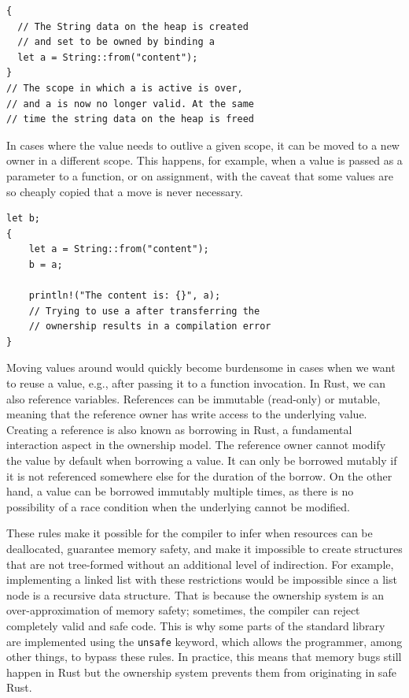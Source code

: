 \documentclass[paper=a4,%
  twoside,%
  BCOR4mm,%
  abstract=true,%
  toc=bibliography,%
  chapterprefix=true,%
  toc=bibliographynumbered,%
  open=right,%
  english,%
  pagesize=pdftex]{scrreprt}
\begin{document}
\begin{lstlisting}[style=boxed, caption=Heap data owned by binding, label=lst:example-ownership]
{
  // The String data on the heap is created
  // and set to be owned by binding a
  let a = String::from("content");
}
// The scope in which a is active is over,
// and a is now no longer valid. At the same
// time the string data on the heap is freed
\end{lstlisting}

In cases where the value needs to outlive a given scope, it can be moved to a new owner in a different scope. This happens, for example, when a value is passed as a parameter to a function, or on assignment, with the caveat that some values are so cheaply copied that a move is never necessary.

\begin{lstlisting}[style=boxed, caption=Transferring ownership, label=lst:transfer-ownership]
let b;
{
    let a = String::from("content");
    b = a;

    println!("The content is: {}", a);
    // Trying to use a after transferring the
    // ownership results in a compilation error
}
\end{lstlisting}

Moving values around would quickly become burdensome in cases when we want to reuse a value, e.g., after passing it to a function invocation. In Rust, we can also reference variables. References can be immutable (read-only) or mutable, meaning that the reference owner has write access to the underlying value. Creating a reference is also known as borrowing in Rust, a fundamental interaction aspect in the ownership model. The reference owner cannot modify the value by default when borrowing a value. It can only be borrowed mutably if it is not referenced somewhere else for the duration of the borrow. On the other hand, a value can be borrowed immutably multiple times, as there is no possibility of a race condition when the underlying cannot be modified.

These rules make it possible for the compiler to infer when resources can be deallocated, guarantee memory safety, and make it impossible to create structures that are not tree-formed without an additional level of indirection. For example, implementing a linked list with these restrictions would be impossible since a list node is a recursive data structure. That is because the ownership system is an over-approximation of memory safety; sometimes, the compiler can reject completely valid and safe code. This is why some parts of the standard library are implemented using the \texttt{unsafe} keyword, which allows the programmer, among other things, to bypass these rules. In practice, this means that memory bugs still happen in Rust but the ownership system prevents them from originating in safe Rust.
\end{document}
